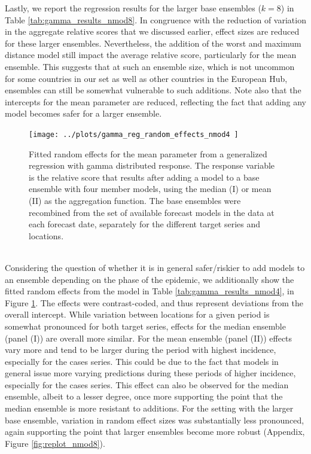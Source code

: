 Lastly, we report the regression results for the larger base ensembles ($k = 8$) in Table \ref{tab:gamma_results_nmod8}. In congruence with the reduction of variation in the aggregate relative scores that we discussed earlier, effect sizes are reduced for these larger ensembles. Nevertheless, the addition of the worst and maximum distance model still impact the average relative score, particularly for the mean ensemble. This suggests that at such an ensemble size, which is not uncommon for some countries in our set as well as other countries in the European Hub, ensembles can still be somewhat vulnerable to such additions. Note also that the intercepts for the mean parameter are reduced, reflecting the fact that adding any model becomes safer for a larger ensemble.

\begin{figure}
\centering
\texttt{[image: ../plots/gamma\_reg\_random\_effects\_nmod4
]}
\caption{Fitted random effects for the mean parameter from a generalized regression with gamma distributed response. The response variable is the relative score that results after adding a model to a base ensemble with four member models, using the median (I) or mean (II) as the aggregation function. The base ensembles were recombined from the set of available forecast models in the data at each forecast date, separately for the different target series and locations.}
\label{fig:replots}
\end{figure}\\
Considering the question of whether it is in general safer/riskier to add models to an ensemble depending on the phase of the epidemic, we additionally show the fitted random effects from the model in Table \ref{tab:gamma_results_nmod4}, in Figure \ref{fig:replots}. The effects were contrast-coded, and thus represent deviations from the overall intercept. While variation between locations for a given period is somewhat pronounced for both target series, effects for the median ensemble (panel (I)) are overall more similar. For the mean ensemble (panel (II)) effects vary more and tend to be larger during the period with highest incidence, especially for the cases series. This could be due to the fact that models in general issue more varying predictions during these periods of higher incidence, especially for the cases series. This effect can also be observed for the median ensemble, albeit to a lesser degree, once more supporting the point that the median ensemble is more resistant to additions. For the setting with the larger base ensemble, variation in random effect sizes was substantially less pronounced, again supporting the point that larger ensembles become more robust (Appendix, Figure \ref{fig:replot_nmod8}).\medskip\\ 
